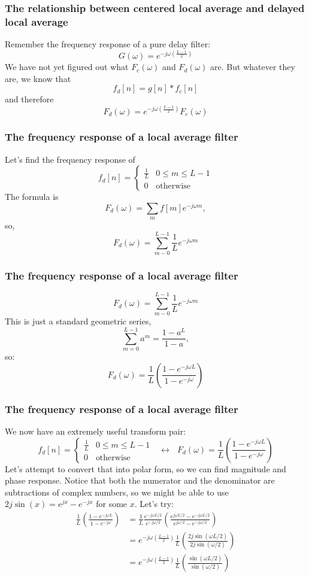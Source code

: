 \documentclass{beamer}
\begin{document}
\begin{frame}
  \frametitle{The relationship between centered local average and delayed local average}

  Remember the frequency response of a pure delay filter:
  \[
  G(\omega)  = e^{-j\omega\left(\frac{L-1}{2}\right)}
  \]
  We have not yet figured out what $F_c(\omega)$ and $F_d(\omega)$
  are.  But whatever they are, we know that
  \[
  f_d[n] = g[n]\ast f_c[n]
  \]
  and therefore
  \[
  F_d(\omega) = e^{-j\omega\left(\frac{L-1}{2}\right)} F_c(\omega)
  \]
\end{frame}
  
\begin{frame}
  \frametitle{The frequency response of a local average filter}

  Let's find the frequency response of
  \[
  f_d[n] = \begin{cases} \frac{1}{L}& 0\le m\le L-1\\
    0&\mbox{otherwise}\end{cases}
  \]
  The formula is
  \[
  F_d(\omega) = \sum_m f[m]e^{-j\omega m},
  \]
  so,
  \[
  F_d(\omega) = \sum_{m-0}^{L-1} \frac{1}{L}e^{-j\omega m}
  \]
\end{frame}
  
\begin{frame}
  \frametitle{The frequency response of a local average filter}

  \[
  F_d(\omega) = \sum_{m-0}^{L-1} \frac{1}{L}e^{-j\omega m}
  \]
  This is just a standard geometric series,
  \[
  \sum_{m=0}^{L-1} a^m = \frac{1-a^L}{1-a},
  \]
  so:
  \[
  F_d(\omega) = \frac{1}{L}\left(\frac{1-e^{-j\omega L}}{1-e^{-j\omega}}\right)
  \]
\end{frame}
  
\begin{frame}
  \frametitle{The frequency response of a local average filter}

  We now have an extremely  useful transform pair:
  \[
  f_d[n] = \begin{cases} \frac{1}{L}& 0\le m\le L-1\\
    0&\mbox{otherwise}\end{cases}~~~\leftrightarrow~~~
  F_d(\omega) = \frac{1}{L}\left(\frac{1-e^{-j\omega L}}{1-e^{-j\omega}}\right)
  \]
  Let's attempt to convert that into polar form, so we can find
  magnitude and phase response. Notice that both the numerator and the
  denominator are subtractions of complex numbers, so we might be able
  to use $2j\sin(x)=e^{jx}-e^{-jx}$ for some $x$.  Let's try:
  \begin{align*}
    \frac{1}{L}\left(\frac{1-e^{-j\omega L}}{1-e^{-j\omega}}\right)
    &= \frac{1}{L}\frac{e^{-j\omega L/2}}{e^{-j\omega/2}}
    \left(\frac{e^{j\omega L/2}-e^{-j\omega L/2}}{e^{j\omega/2}-e^{-j\omega/2}}\right)\\
    &= e^{-j\omega\left(\frac{L-1}{2}\right)}\frac{1}{L}
    \left(\frac{2j\sin(\omega L/2)}{2j\sin(\omega/2)}\right)\\
    &= e^{-j\omega\left(\frac{L-1}{2}\right)}\frac{1}{L}
    \left(\frac{\sin(\omega L/2)}{\sin(\omega/2)}\right)
  \end{align*}
\end{frame}
  
\end{document}

